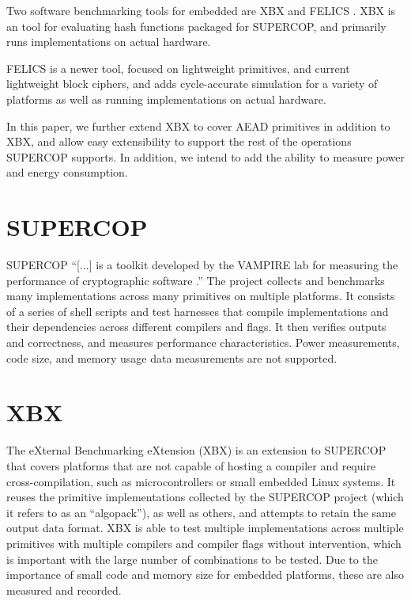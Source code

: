 \documentclass[twoside,11pt]{cergdoc}
\begin{document}
Two software benchmarking tools for embedded are XBX\cite{xbx} and
FELICS \cite{felics}\cite{dinu_triathlon}. XBX is an tool for evaluating
hash functions packaged for SUPERCOP, and primarily runs implementations on
actual hardware. 

FELICS is a newer tool, focused on lightweight primitives, and current
lightweight block ciphers, and adds cycle-accurate simulation for a variety of
platforms as well as running implementations on actual hardware. 

In this paper, we further extend XBX to cover AEAD primitives in addition to
XBX, and allow easy extensibility to support the rest of the operations SUPERCOP
supports. In addition, we intend to add the ability to measure power and energy
consumption.

  \section{SUPERCOP}
SUPERCOP ``[...] is a toolkit developed by the VAMPIRE lab for measuring
the performance of cryptographic software \cite{supercop}.'' The project collects
and benchmarks many implementations across many primitives on multiple
platforms. It consists of a series of shell scripts and test harnesses that
compile implementations and their dependencies across different compilers and
flags. It then verifies outputs and correctness, and measures performance
characteristics. Power measurements, code size, and memory usage data
measurements are not supported.

  \section{XBX}
The eXternal Benchmarking eXtension (XBX)\cite{xbx} is an extension to SUPERCOP that covers
platforms that are not capable of hosting a compiler and require cross-compilation,
such as microcontrollers or small embedded Linux systems. It reuses the
primitive implementations collected by the SUPERCOP project (which it refers to as
an ``algopack''), as well as others, and
attempts to retain the same output data format. XBX is able to test multiple
implementations across multiple primitives  with multiple compilers and compiler
flags without intervention, which is important with the large number of
combinations to be tested. Due to the importance of small code and memory size for
embedded platforms, these are also measured and recorded.

\end{document}
